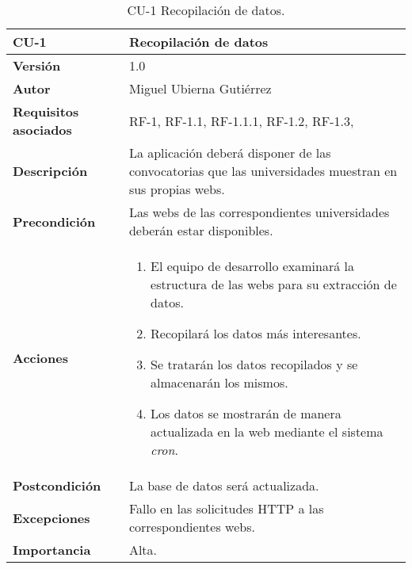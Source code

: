 \begin{table}[p]
	\centering
	\begin{tabularx}{\linewidth}{ p{} p{} }
		\toprule
		\textbf{CU-1}    & \textbf{Recopilación de datos}\\
		\toprule
		\textbf{Versión}              & 1.0    \\
		\textbf{Autor}                & Miguel Ubierna Gutiérrez \\
		\textbf{Requisitos asociados} & RF-1, RF-1.1, RF-1.1.1, RF-1.2, RF-1.3,  \\
		\textbf{Descripción}          & La aplicación deberá disponer de las convocatorias que las universidades muestran en sus propias webs. \\
		\textbf{Precondición}         & Las webs de las correspondientes universidades deberán estar disponibles. \\
		\textbf{Acciones}             &
		\begin{enumerate}
			\def\labelenumi{\arabic{enumi}.}
			\tightlist
			\item El equipo de desarrollo examinará la estructura de las webs para su extracción de datos.
			\item Recopilará los datos más interesantes.
                \item Se tratarán los datos recopilados y se almacenarán los mismos.
                \item Los datos se mostrarán de manera actualizada en la web mediante el sistema \textit{cron}.
		\end{enumerate}\\
		\textbf{Postcondición}        & La base de datos será actualizada. \\
		\textbf{Excepciones}          & Fallo en las solicitudes HTTP a las correspondientes webs. \\
		\textbf{Importancia}          & Alta. \\
		\bottomrule
	\end{tabularx}
	\caption{CU-1 Recopilación de datos.}
\end{table}


